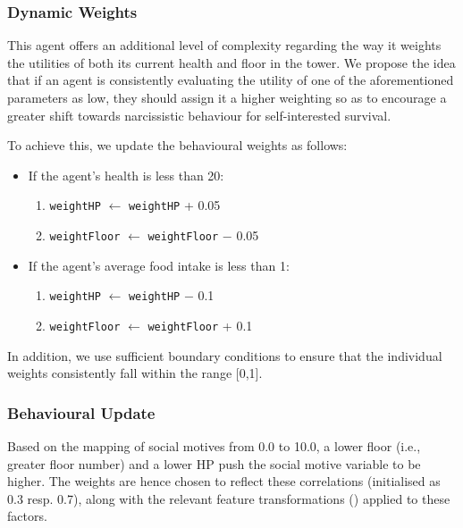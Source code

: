 \subsubsection{Dynamic Weights}

This agent offers an additional level of complexity regarding the way it weights the utilities of both its current health and floor in the tower. We propose the idea that if an agent is consistently evaluating the utility of one of the aforementioned parameters as low, they should assign it a higher weighting so as to encourage a greater shift towards narcissistic behaviour for self-interested survival.

To achieve this, we update the behavioural weights as follows:

\begin{itemize}
    \item If the agent's health is less than 20:
    \begin{enumerate}
        \item \texttt{weightHP} $\leftarrow$ \texttt{weightHP} + 0.05
        \item \texttt{weightFloor} $\leftarrow$ \texttt{weightFloor} $-$ 0.05
    \end{enumerate}
    \item If the agent's average food intake is less than 1:
    \begin{enumerate}
        \item \texttt{weightHP} $\leftarrow$ \texttt{weightHP} $-$ 0.1
        \item \texttt{weightFloor} $\leftarrow$ \texttt{weightFloor} + 0.1
    \end{enumerate}
\end{itemize}

In addition, we use sufficient boundary conditions to ensure that the individual weights consistently fall within the range [0,1].

\subsubsection{Behavioural Update}

Based on the mapping of social motives from 0.0 to 10.0, a lower floor (i.e., greater floor number) and a lower HP push the social motive variable to be higher. The weights are hence chosen to reflect these correlations (initialised as 0.3 resp. 0.7), along with the relevant feature transformations () applied to these factors.

